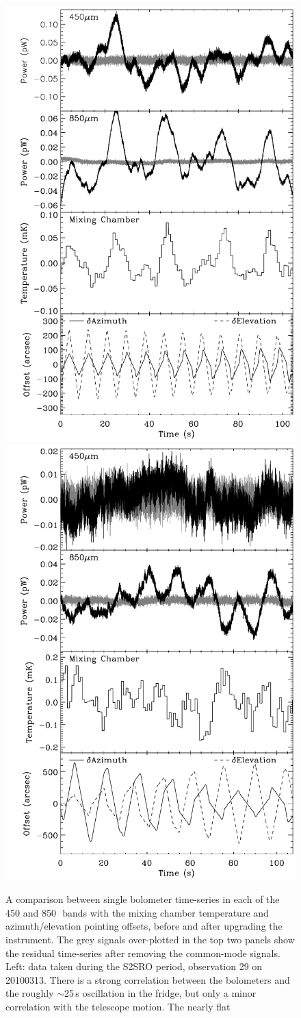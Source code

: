 \documentclass[useAMS,usenatbib,nofootinbib]{mn2e}
\begin{document}
\begin{figure}
\includegraphics[width=0.49\linewidth]{bolos_point_mix_s2sro}
\includegraphics[width=0.49\linewidth]{bolos_point_mix}
\caption{A comparison between single bolometer time-series in each of
  the 450 and 850\,\micron\ bands with the mixing chamber temperature
  and azimuth/elevation pointing offsets, before and after upgrading
  the instrument. The grey signals over-plotted in the top two panels
  show the residual time-series after removing the common-mode
  signals.  Left: data taken during the S2SRO period, observation 29
  on 20100313. There is a strong correlation between the bolometers
  and the roughly $\sim$25\,s oscillation in the fridge, but only a
  minor correlation with the telescope motion. The nearly flat
}
\end{figure}
\end{document}
